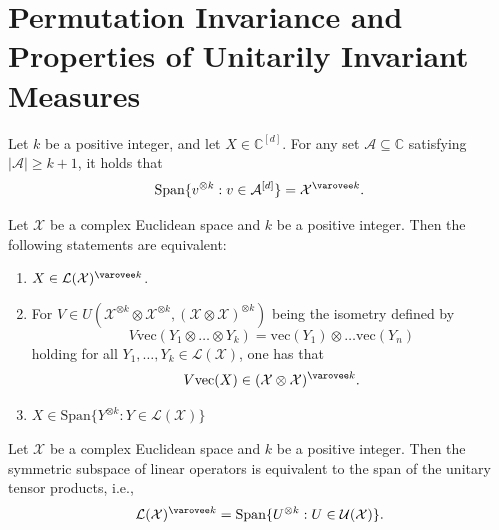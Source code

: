 \section{Permutation Invariance and Properties of Unitarily Invariant Measures}

\begin{theorem}\label{thm:TensorPowerSpanTheorem}
    Let $k$ be a positive integer, and let $X \in \mathbb{C}^[d]$. For any set $\mathcal{A} \subseteq \mathbb{C}$ satisfying $|\mathcal{A}| \geq k + 1$, it holds that
    \begin{equation}
        \text{Span}\{v^{\otimes k} : v \in \mathcal{A}^{[d]}\}=\mathcal{X}^{\varovee k}.
    \end{equation}
\end{theorem}

\begin{proposition}\label{prop:symLkSpanTensorProduct}
    Let $\mathcal{X}$ be a complex Euclidean space and $k$ be a positive integer.
    Then the following statements are equivalent:
    \begin{enumerate}
        \item $X \in \mathcal{L}(\mathcal{X})^{\varovee k}$.

        \item For $V \in U(\mathcal{X}^{\otimes k} \otimes \mathcal{X}^{\otimes k}, (\mathcal{X} \otimes \mathcal{X})^{\otimes k})$ being the isometry defined by
        \begin{equation}
            V \text{vec}(Y_1 \otimes \dots \otimes Y_k) = \text{vec}(Y_1) \otimes \dots \text{vec}(Y_n)
        \end{equation}
        holding for all $Y_1, \dots, Y_k \in \mathcal{L}(\mathcal{X})$, one has that
        \begin{equation}
            V \text{vec}(X) \in (\mathcal{X} \otimes \mathcal{X})^{\varovee k}.
        \end{equation}

        \item $X \in \text{Span}\{Y^{\otimes k} : Y \in \mathcal{L}(\mathcal{X})\}$
    \end{enumerate}

\end{proposition}

\begin{theorem}\label{thm:equivalence_sym_Lk_unitary_tensor_span}
    Let $\mathcal{X}$ be a complex Euclidean space and $k$ be a positive integer.
    Then the symmetric subspace of linear operators is equivalent to the span of the unitary tensor products, i.e.,
    \begin{equation}
        \mathcal{L}(\mathcal{X})^{\varovee k} = \text{Span}\{U^{\otimes k} : U \in \mathcal{U}(\mathcal{X})\}.
    \end{equation}

\end{theorem}

